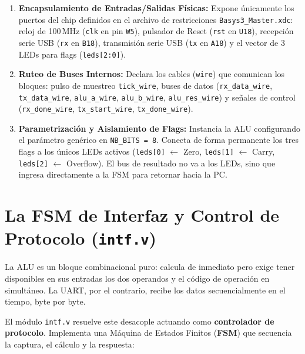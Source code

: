 \documentclass[10.5pt,a4paper]{article}
\begin{document}
\begin{enumerate}\setlength\itemsep{0.15em}
    \item \textbf{Encapsulamiento de Entradas/Salidas Físicas:} Expone únicamente los puertos del chip definidos en el archivo de restricciones \texttt{Basys3\_Master.xdc}: reloj de 100\,MHz (\texttt{clk} en pin \texttt{W5}), pulsador de Reset (\texttt{rst} en \texttt{U18}), recepción serie USB (\texttt{rx} en \texttt{B18}), transmisión serie USB (\texttt{tx} en \texttt{A18}) y el vector de 3 LEDs para flags (\texttt{leds[2:0]}).
    \item \textbf{Ruteo de Buses Internos:} Declara los cables (\texttt{wire}) que comunican los bloques: pulso de muestreo \texttt{tick\_wire}, buses de datos (\texttt{rx\_data\_wire}, \texttt{tx\_data\_wire}, \texttt{alu\_a\_wire}, \texttt{alu\_b\_wire}, \texttt{alu\_res\_wire}) y señales de control (\texttt{rx\_done\_wire}, \texttt{tx\_start\_wire}, \texttt{tx\_done\_wire}).
    \item \textbf{Parametrización y Aislamiento de Flags:} Instancia la ALU configurando el parámetro genérico en \texttt{NB\_BITS = 8}. Conecta de forma permanente los tres flags a los únicos LEDs activos (\texttt{leds[0]} $\leftarrow$ Zero, \texttt{leds[1]} $\leftarrow$ Carry, \texttt{leds[2]} $\leftarrow$ Overflow). El bus de resultado no va a los LEDs, sino que ingresa directamente a la FSM para retornar hacia la PC.
\end{enumerate}

\section{La FSM de Interfaz y Control de Protocolo (\texttt{intf.v})}
La ALU es un bloque combinacional puro: calcula de inmediato pero exige tener disponibles en sus entradas los dos operandos y el código de operación en simultáneo. La UART, por el contrario, recibe los datos secuencialmente en el tiempo, byte por byte.

El módulo \texttt{intf.v} resuelve este desacople actuando como \textbf{controlador de protocolo}. Implementa una Máquina de Estados Finitos (\textbf{FSM}) que secuencia la captura, el cálculo y la respuesta:
\end{document}
